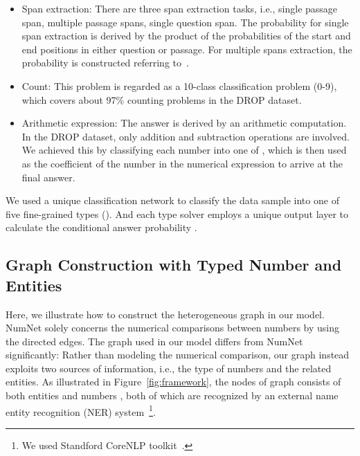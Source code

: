 \documentclass{article}
\begin{document}
\begin{itemize}\item Span extraction: There are three span extraction tasks, i.e., single passage span, multiple passage spans, single question span. The probability for single span extraction is derived by the product of the probabilities of the start and end positions in either question or passage. For multiple spans extraction, the probability is constructed referring to~\cite{DBLP:journals/corr/abs-1909-13375}.
\item Count: This problem is regarded as a 10-class classification problem (0-9), which covers about 97\% counting problems in the DROP dataset.
\item Arithmetic expression: The answer is derived by an arithmetic computation. In the DROP dataset, only addition and subtraction operations are involved. We achieved this by classifying each number into one of , which is then used as the coefficient of the number in the numerical expression to arrive at the final answer.
\end{itemize}
We used a unique classification network to classify the data sample into one of five fine-grained types ().
And each type solver employs a unique output layer to calculate the conditional answer probability .



\subsection{Graph Construction with Typed Number and Entities}
\label{sec:graph}


Here, we illustrate how to construct the heterogeneous graph  in our model.
NumNet solely concerns the numerical comparisons between numbers by using the directed edges.
The graph used in our model differs from NumNet significantly: Rather than modeling the numerical comparison, our graph instead exploits two sources of information, i.e., the type of numbers and the related entities.
As illustrated in Figure~\ref{fig:framework}, the nodes of graph  consists of both entities  and numbers , both of which are recognized by an external name entity recognition (NER) system~\footnote{We used Standford CoreNLP toolkit~\cite{DBLP:conf/acl/ManningSBFBM14}.}.
\end{document}
